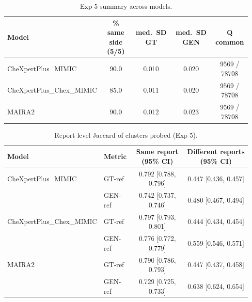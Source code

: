 \begin{table}[t]
\centering
\small
\caption{Exp 5 summary across models.}
\label{tab:supp_exp5_summary}
\begin{tabular}{lcccc}
\toprule
Model & \% same side (5/5) & med.\ SD GT & med.\ SD GEN & Q common \\
\midrule
CheXpertPlus\_MIMIC & 90.0 & 0.010 & 0.020 & 9569 / 78708 \\
CheXpertPlus\_Chex\_MIMIC & 85.0 & 0.011 & 0.020 & 9569 / 78708 \\
MAIRA2 & 90.0 & 0.012 & 0.023 & 9569 / 78708 \\
\bottomrule
\end{tabular}
\end{table}

\begin{table}[t]
\centering
\footnotesize
\caption{Report-level Jaccard of clusters probed (Exp 5).}
\label{tab:supp_exp5_jaccard}
\begin{tabular}{llcc}
\toprule
Model & Metric & Same report (95\% CI) & Different reports (95\% CI) \\
\midrule
CheXpertPlus\_MIMIC & GT-ref & 0.792 [0.788, 0.796] & 0.447 [0.436, 0.457] \\
 & GEN-ref & 0.742 [0.737, 0.746] & 0.480 [0.467, 0.494] \\
CheXpertPlus\_Chex\_MIMIC & GT-ref & 0.797 [0.793, 0.801] & 0.444 [0.434, 0.454] \\
 & GEN-ref & 0.776 [0.772, 0.779] & 0.559 [0.546, 0.571] \\
MAIRA2 & GT-ref & 0.790 [0.786, 0.793] & 0.447 [0.437, 0.458] \\
 & GEN-ref & 0.729 [0.725, 0.733] & 0.638 [0.624, 0.654] \\
\bottomrule
\end{tabular}
\end{table}
